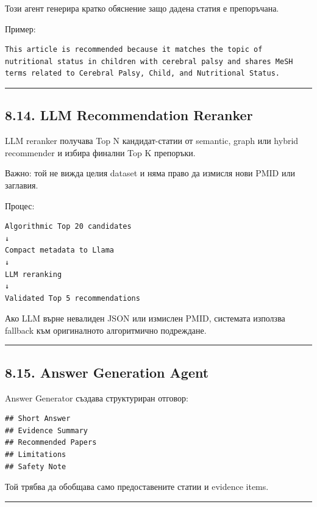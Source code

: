 \documentclass[12pt,a4paper]{article}
\begin{document}
Този агент генерира кратко обяснение защо дадена статия е препоръчана.

Пример:

\begin{verbatim}
This article is recommended because it matches the topic of nutritional status in children with cerebral palsy and shares MeSH terms related to Cerebral Palsy, Child, and Nutritional Status.
\end{verbatim}

\vspace{0.5em}\hrule\vspace{1.0em}

\subsection{8.14. LLM Recommendation Reranker}\label{llm-recommendation-reranker}

LLM reranker получава Top N кандидат-статии от semantic, graph или hybrid recommender и избира финални Top K препоръки.

Важно: той не вижда целия dataset и няма право да измисля нови PMID или заглавия.

Процес:

\begin{verbatim}
Algorithmic Top 20 candidates
↓
Compact metadata to Llama
↓
LLM reranking
↓
Validated Top 5 recommendations
\end{verbatim}

Ако LLM върне невалиден JSON или измислен PMID, системата използва fallback към оригиналното алгоритмично подреждане.

\vspace{0.5em}\hrule\vspace{1.0em}

\subsection{8.15. Answer Generation Agent}\label{answer-generation-agent}

Answer Generator създава структуриран отговор:

\begin{verbatim}
## Short Answer
## Evidence Summary
## Recommended Papers
## Limitations
## Safety Note
\end{verbatim}

Той трябва да обобщава само предоставените статии и evidence items.

\vspace{0.5em}\hrule\vspace{1.0em}
\end{document}
